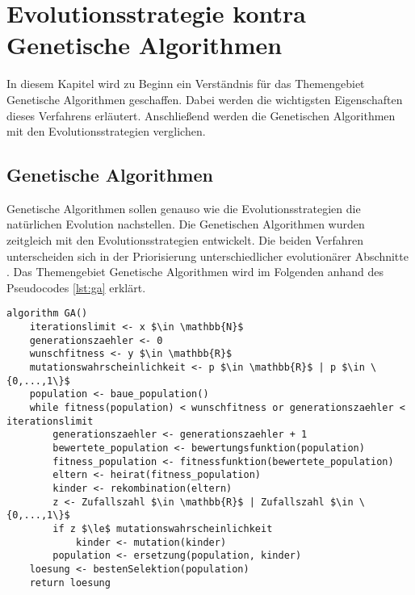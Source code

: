 \section{Evolutionsstrategie kontra Genetische Algorithmen}
In diesem Kapitel wird zu Beginn ein Verständnis für das Themengebiet Genetische Algorithmen geschaffen. Dabei werden die wichtigsten Eigenschaften dieses Verfahrens erläutert. Anschließend werden die Genetischen Algorithmen mit den Evolutionsstrategien verglichen.


\subsection{Genetische Algorithmen}
Genetische Algorithmen sollen genauso wie die Evolutionsstrategien die natürlichen Evolution nachstellen.
Die Genetischen Algorithmen wurden zeitgleich mit den Evolutionsstrategien entwickelt. Die beiden Verfahren unterscheiden sich in der Priorisierung unterschiedlicher evolutionärer Abschnitte \cite[S. 185]{schoeneburg}.
Das Themengebiet Genetische Algorithmen wird im Folgenden anhand des Pseudocodes \ref{lst:ga} erklärt.

\begin{lstlisting}[caption={Grundlegender Genetischer Algorithmus}, firstnumber=1, captionpos=b, label=lst:ga]
algorithm GA()
	iterationslimit <- x $\in \mathbb{N}$
	generationszaehler <- 0
	wunschfitness <- y $\in \mathbb{R}$
	mutationswahrscheinlichkeit <- p $\in \mathbb{R}$ | p $\in \{0,...,1\}$
	population <- baue_population()
	while fitness(population) < wunschfitness or generationszaehler < iterationslimit
		generationszaehler <- generationszaehler + 1
		bewertete_population <- bewertungsfunktion(population)
		fitness_population <- fitnessfunktion(bewertete_population)
		eltern <- heirat(fitness_population)
		kinder <- rekombination(eltern)
		z <- Zufallszahl $\in \mathbb{R}$ | Zufallszahl $\in \{0,...,1\}$
		if z $\le$ mutationswahrscheinlichkeit 
			kinder <- mutation(kinder)
		population <- ersetzung(population, kinder)
	loesung <- bestenSelektion(population)
	return loesung
\end{lstlisting}

